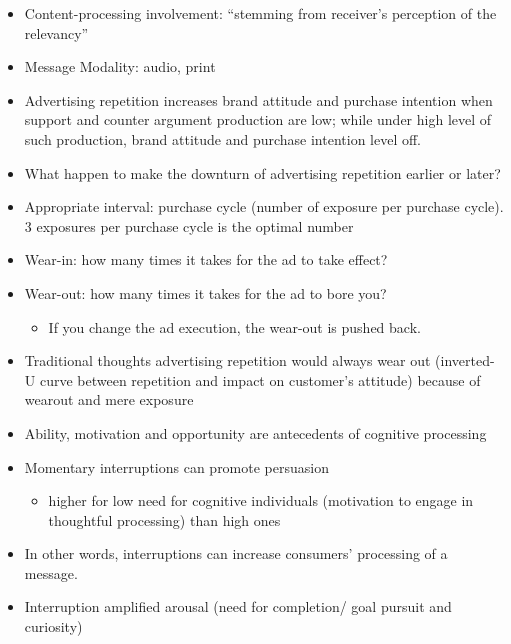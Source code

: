 \documentclass[
]{book}
\providecommand{\tightlist}{%
  \setlength{\itemsep}{0pt}\setlength{\parskip}{0pt}}
\begin{document}
\begin{itemize}
\item
  Content-processing involvement: ``stemming from receiver's perception of the relevancy''
\item
  Message Modality: audio, print
\end{itemize}

\citep{batra1986}

\begin{itemize}
\item
  Advertising repetition increases brand attitude and purchase intention when support and counter argument production are low; while under high level of such production, brand attitude and purchase intention level off.
\item
  What happen to make the downturn of advertising repetition earlier or later?
\item
  Appropriate interval: purchase cycle (number of exposure per purchase cycle). 3 exposures per purchase cycle is the optimal number
\item
  Wear-in: how many times it takes for the ad to take effect?
\item
  Wear-out: how many times it takes for the ad to bore you?

  \begin{itemize}
  \tightlist
  \item
    If you change the ad execution, the wear-out is pushed back.
  \end{itemize}
\item
  Traditional thoughts advertising repetition would always wear out (inverted-U curve between repetition and impact on customer's attitude) because of wearout and mere exposure
\item
  Ability, motivation and opportunity are antecedents of cognitive processing
\end{itemize}

\citep{kupor2015}

\begin{itemize}
\item
  Momentary interruptions can promote persuasion

  \begin{itemize}
  \tightlist
  \item
    higher for low need for cognitive individuals (motivation to engage in thoughtful processing) than high ones
  \end{itemize}
\item
  In other words, interruptions can increase consumers' processing of a message.
\item
  Interruption amplified arousal (need for completion/ goal pursuit and curiosity)
\end{itemize}
\end{document}
